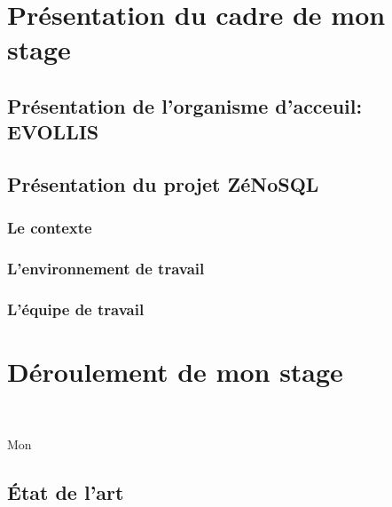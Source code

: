 




\begin{abstract}
  
\end{abstract}

\tableofcontents





\part{Présentation du cadre de mon stage}

\chapter{Présentation de l'organisme d'acceuil: {\sf EVOLLIS}}
\chapter{Présentation du projet \textsf{ZéNoSQL}}
\section{Le contexte}

\section{L'environnement de travail}
\section{L'équipe de travail}

\part{Déroulement de mon stage}

\newpage
~
\vspace{7cm}
\begin{center}
  \textsf{Mon} 
\end{center}
\newpage

\chapter{État de l'art}


